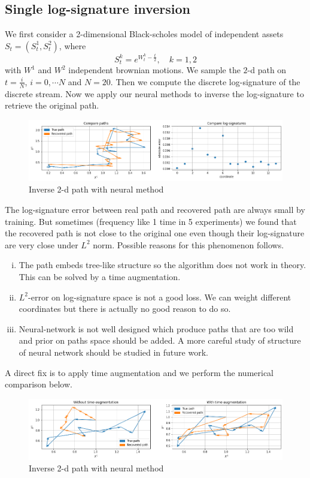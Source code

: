 \documentclass[12pt]{report}
\theoremstyle{definition}
\theoremstyle{remark}
\begin{document}
\subsection{Single log-signature inversion}
We first consider a 2-dimensional Black-scholes model of independent assets $S_{t} = (S^{1}_{t}, S^{2}_{t})$, where
\begin{equation*}
  S^{k}_{t} = e^{W^{k}_{t} - \frac{t}{2}},\quad k = 1,2
\end{equation*}
with $W^{1}$ and $W^{2}$ independent brownian motions. We sample the $2$-d path on $t = \frac{i}{N}$, $i = 0,\cdots N$ and $N = 20$. Then we compute the discrete log-signature of the discrete stream. Now we apply our neural methods to inverse the log-signature to retrieve the original path.
 \begin{figure}[H]
    \centering
    \includegraphics[width=\textwidth]{figs/inverse2.png}
    \caption{Inverse 2-d path with neural method}
\end{figure}
The log-signature error between real path and recovered path are always small by training. But sometimes (frequency like 1 time in 5 experiments) we found that the recovered path is not close to the original one even though their log-signature are very close under $L^{2}$ norm. Possible reasons for this phenomenon follows.
\begin{enumerate}[(i)]
  \item The path embeds tree-like structure so the algorithm does not work in theory. This can be solved by a time augmentation. 
  \item $L^{2}$-error on log-signature space is not a good loss. We can weight different coordinates but there is actually no good reason to do so.
  \item Neural-network is not well designed which produce paths that are too wild and prior on paths space should be added. A more careful study of structure of neural network should be studied in future work.
\end{enumerate}
A direct fix is to apply time augmentation and we perform the numerical comparison below. 
\begin{figure}[H]
  \centering
  \includegraphics[width=\textwidth]{figs/inverse7.png}
  \caption{Inverse 2-d path with neural method}
\end{figure}
\end{document}
